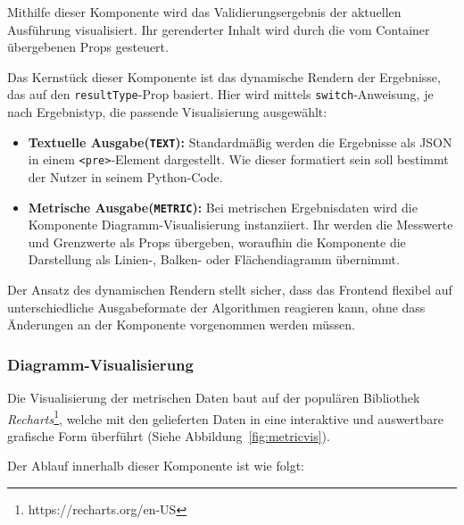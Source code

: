 Mithilfe dieser Komponente wird das Validierungsergebnis der aktuellen Ausführung visualisiert. Ihr gerenderter Inhalt wird durch die vom Container übergebenen Props gesteuert.

Das Kernstück dieser Komponente ist das dynamische Rendern der Ergebnisse, das auf den \texttt{resultType}-Prop basiert. Hier wird mittels \texttt{switch}-Anweisung, je nach Ergebnistyp, die passende Visualisierung ausgewählt:

\begin{itemize}
  \item \textbf{Textuelle Ausgabe(\texttt{TEXT}):} Standardmäßig werden die Ergebnisse als JSON in einem \texttt{<pre>}-Element dargestellt. Wie dieser formatiert sein soll bestimmt der Nutzer in seinem Python-Code.
  \item \textbf{Metrische Ausgabe(\texttt{METRIC}):} Bei metrischen Ergebnisdaten wird die Komponente Diagramm-Visualisierung instanziiert. Ihr werden die Messwerte und Grenzwerte als Props übergeben, woraufhin die Komponente die Darstellung als Linien-, Balken- oder Flächendiagramm übernimmt.
\end{itemize}

Der Ansatz des dynamischen Rendern stellt sicher, dass das Frontend flexibel auf unterschiedliche Ausgabeformate der Algorithmen reagieren kann, ohne dass Änderungen an der Komponente vorgenommen werden müssen.

\subsubsection*{Diagramm-Visualisierung}

Die Visualisierung der metrischen Daten baut auf der populären Bibliothek \textit{Recharts}\footnote{https://recharts.org/en-US}, welche mit den gelieferten Daten in eine interaktive und auswertbare grafische Form überführt (Siehe Abbildung~\ref{fig:metricvis}).

Der Ablauf innerhalb dieser Komponente ist wie folgt:

